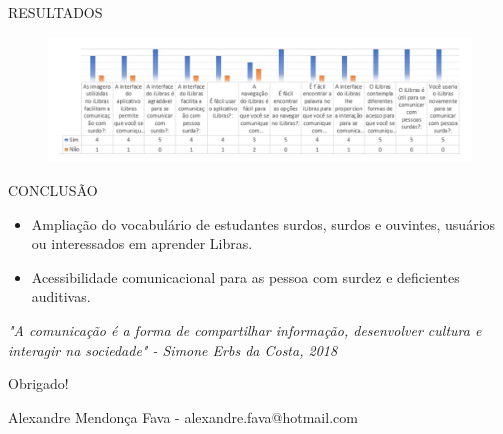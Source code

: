 \documentclass{Alexandre}
\begin{document}
\begin{frame}{RESULTADOS}
    
    \begin{figure}
        \includegraphics[scale = 0.28]{Figuras/Resultados.jpg}
    \end{figure}

\end{frame}


\begin{frame}{CONCLUSÃO}
    
    \begin{itemize}
        \item Ampliação do vocabulário de estudantes surdos, surdos e ouvintes, usuários ou interessados em aprender Libras.
        \item Acessibilidade comunicacional para as pessoa com surdez e deficientes auditivas. 
    \end{itemize}

\end{frame}


\begin{frame}
    \begin{center}
        \textit{"A comunicação é a forma de compartilhar informação, desenvolver cultura e interagir na sociedade" - Simone Erbs da Costa, 2018}\\
        \vspace{1.5cm}
        \begin{Huge} 
            Obrigado!\\
        \end{Huge}
        \bigskip
        Alexandre Mendonça Fava - \alert{alexandre.fava@hotmail.com}\\
    \end{center}
\end{frame}
\end{document}
